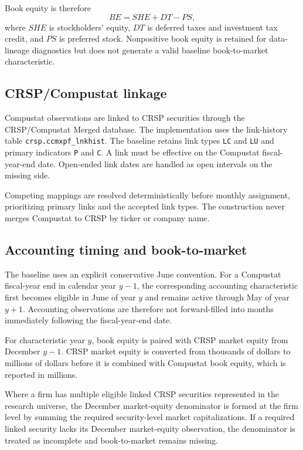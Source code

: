 Book equity is therefore
\begin{equation}
BE = SHE + DT - PS,
\end{equation}
where $SHE$ is stockholders' equity, $DT$ is deferred taxes and investment tax credit, and $PS$ is preferred stock. Nonpositive book equity is retained for data-lineage diagnostics but does not generate a valid baseline book-to-market characteristic.

\subsection{CRSP/Compustat linkage}

Compustat observations are linked to CRSP securities through the CRSP/Compustat Merged database. The implementation uses the link-history table \texttt{crsp.ccmxpf\_lnkhist}. The baseline retains link types \texttt{LC} and \texttt{LU} and primary indicators \texttt{P} and \texttt{C}. A link must be effective on the Compustat fiscal-year-end date. Open-ended link dates are handled as open intervals on the missing side.

Competing mappings are resolved deterministically before monthly assignment, prioritizing primary links and the accepted link types. The construction never merges Compustat to CRSP by ticker or company name.

\subsection{Accounting timing and book-to-market}

The baseline uses an explicit conservative June convention. For a Compustat fiscal-year end in calendar year $y-1$, the corresponding accounting characteristic first becomes eligible in June of year $y$ and remains active through May of year $y+1$. Accounting observations are therefore not forward-filled into months immediately following the fiscal-year-end date.

For characteristic year $y$, book equity is paired with CRSP market equity from December $y-1$. CRSP market equity is converted from thousands of dollars to millions of dollars before it is combined with Compustat book equity, which is reported in millions.

Where a firm has multiple eligible linked CRSP securities represented in the research universe, the December market-equity denominator is formed at the firm level by summing the required security-level market capitalizations. If a required linked security lacks its December market-equity observation, the denominator is treated as incomplete and book-to-market remains missing.

